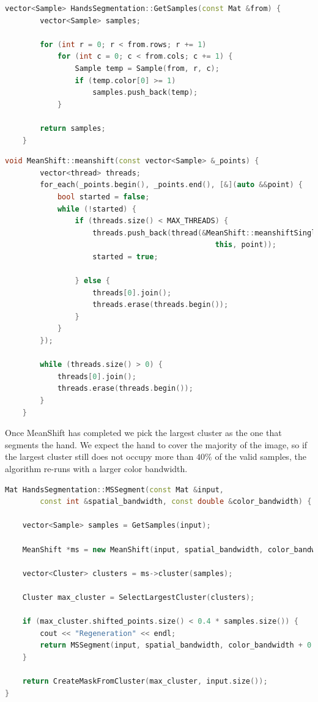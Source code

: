 \begin{lstlisting}[language = c++]
    vector<Sample> HandsSegmentation::GetSamples(const Mat &from) {
        vector<Sample> samples;
    
        for (int r = 0; r < from.rows; r += 1)
            for (int c = 0; c < from.cols; c += 1) {
                Sample temp = Sample(from, r, c);
                if (temp.color[0] >= 1)
                    samples.push_back(temp);
            }
    
        return samples;
    }
\end{lstlisting}

\begin{lstlisting}[language = c++]    
    void MeanShift::meanshift(const vector<Sample> &_points) {
        vector<thread> threads;
        for_each(_points.begin(), _points.end(), [&](auto &&point) {
            bool started = false;
            while (!started) {
                if (threads.size() < MAX_THREADS) {
                    threads.push_back(thread(&MeanShift::meanshiftSinglePoint, 
                                                this, point));
                    started = true;
    
                } else {
                    threads[0].join();
                    threads.erase(threads.begin());
                }
            }
        });
    
        while (threads.size() > 0) {
            threads[0].join();
            threads.erase(threads.begin());
        }
    }
\end{lstlisting}

Once MeanShift has completed we pick the largest cluster as the one
that segments the hand. We expect the hand to cover the majority of the image,
so if the largest cluster still does not occupy more than $40\%$ of the valid
samples, the algorithm re-runs with a larger color bandwidth.

\begin{lstlisting}[language = c++]
Mat HandsSegmentation::MSSegment(const Mat &input, 
        const int &spatial_bandwidth, const double &color_bandwidth) {

    vector<Sample> samples = GetSamples(input);

    MeanShift *ms = new MeanShift(input, spatial_bandwidth, color_bandwidth);

    vector<Cluster> clusters = ms->cluster(samples);

    Cluster max_cluster = SelectLargestCluster(clusters);

    if (max_cluster.shifted_points.size() < 0.4 * samples.size()) {
        cout << "Regeneration" << endl;
        return MSSegment(input, spatial_bandwidth, color_bandwidth + 0.5);
    }

    return CreateMaskFromCluster(max_cluster, input.size());
}
\end{lstlisting}

